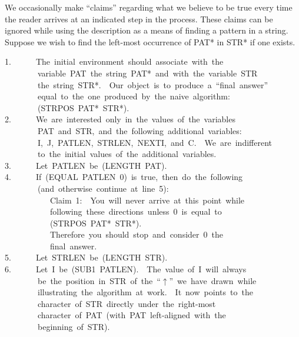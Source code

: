 \documentclass[11pt]{book}
\newenvironment{pubasis}{\begin{flushleft}\ttfamily\small}{\normalsize\rmfamily\end{flushleft}}
\begin{document}
We  occasionally make ``claims'' regarding what we believe to be
true every time the reader arrives at an indicated step in the process.
These claims can be ignored while using the description as a
means of finding a pattern in a string.  Suppose we wish
to find the left-most occurrence of PAT* in STR* if one exists.
\begin{pubasis}
1.~~~~~~The~initial~environment~should~associate~with~the\\
~~~~~~~~variable~PAT~the~string~PAT*~and~with~the~variable~STR\\
~~~~~~~~the~string~STR*.~~Our~object~is~to~produce~a~``final~answer''\\
~~~~~~~~equal~to~the~one~produced~by~the~naive~algorithm:\\
~~~~~~~~(STRPOS~PAT*~STR*).\\

2.~~~~~~We~are~interested~only~in~the~values~of~the~variables\\
~~~~~~~~PAT~and~STR,~and~the~following~additional~variables:\\
~~~~~~~~I,~J,~PATLEN,~STRLEN,~NEXTI,~and~C.~~We~are~indifferent\\
~~~~~~~~to~the~initial~values~of~the~additional~variables.\\

3.~~~~~~Let~PATLEN~be~(LENGTH~PAT).\\

4.~~~~~~If~(EQUAL~PATLEN~0)~is~true,~then~do~the~following\\
~~~~~~~~(and~otherwise~continue~at~line~5):\\

~~~~~~~~~~~Claim~1:~~You~will~never~arrive~at~this~point~while\\
~~~~~~~~~~~following~these~directions~unless~0~is~equal~to\\
~~~~~~~~~~~(STRPOS~PAT*~STR*).\\

~~~~~~~~~~~Therefore~you~should~stop~and~consider~0~the\\
~~~~~~~~~~~final~answer.\\

5.~~~~~~Let~STRLEN~be~(LENGTH~STR).\\

6.~~~~~~Let~I~be~(SUB1~PATLEN).~~The~value~of~I~will~always\\
~~~~~~~~be~the~position~in~STR~of~the~``$\uparrow$''~we~have~drawn~while\\
~~~~~~~~illustrating~the~algorithm~at~work.~~It~now~points~to~the\\
~~~~~~~~character~of~STR~directly~under~the~right-most\\
~~~~~~~~character~of~PAT~(with~PAT~left-aligned~with~the\\
~~~~~~~~beginning~of~STR).\\


\end{pubasis}
\end{document}
